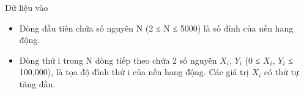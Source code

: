 Dữ liệu vào
\begin{itemize}
	\item Dòng đầu tiên chứa số nguyên N (2 ≤ N ≤ 5000) là số đỉnh của nền hang động.
	\item Dòng thứ i trong N dòng tiếp theo chứa 2 số nguyên $X_{i}$, $Y_{i}$ (0 ≤ $X_{i}$, $Y_{i}$ ≤ 100,000), là tọa độ đỉnh thứ i của nền hang động. Các giá trị $X_{i}$ có thứ tự tăng dần.
\end{itemize}